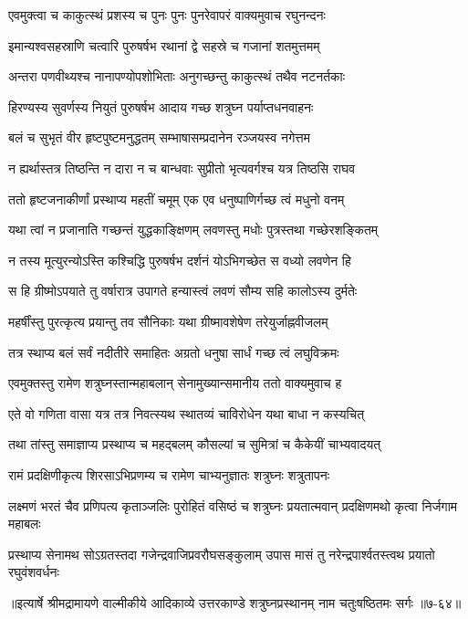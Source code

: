 
\twolineshloka
{एवमुक्त्वा च काकुत्स्थं प्रशस्य च पुनः पुनः}
{पुनरेवापरं वाक्यमुवाच रघुनन्दनः} %

\twolineshloka
{इमान्यश्वसहस्राणि चत्वारि पुरुषर्षभ}
{रथानां द्वे सहस्रे च गजानां शतमुत्तमम्} %

\twolineshloka
{अन्तरा पणवीथ्यश्च नानापण्योपशोभिताः}
{अनुगच्छन्तु काकुत्स्थं तथैव नटनर्तकाः} %

\twolineshloka
{हिरण्यस्य सुवर्णस्य नियुतं पुरुषर्षभ}
{आदाय गच्छ शत्रुघ्न पर्याप्तधनवाहनः} %

\twolineshloka
{बलं च सुभृतं वीर हृष्टपुष्टमनुद्धतम्}
{सम्भाषासम्प्रदानेन रञ्जयस्व नगेत्तम} %

\twolineshloka
{न ह्यर्थास्तत्र तिष्ठन्ति न दारा न च बान्धवाः}
{सुप्रीतो भृत्यवर्गश्च यत्र तिष्ठसि राघव} %

\twolineshloka
{ततो हृष्टजनाकीर्णां प्रस्थाप्य महतीं चमूम्}
{एक एव धनुष्पाणिर्गच्छ त्वं मधुनो वनम्} %

\twolineshloka
{यथा त्वां न प्रजानाति गच्छन्तं युद्धकाङ्क्षिणम्}
{लवणस्तु मधोः पुत्रस्तथा गच्छेरशङ्कितम्} %

\twolineshloka
{न तस्य मूत्युरन्योऽस्ति कश्चिद्धि पुरुषर्षभ}
{दर्शनं योऽभिगच्छेत स वध्यो लवणेन हि} %

\twolineshloka
{स हि ग्रीष्मोऽपयाते तु वर्षारात्र उपागते}
{हन्यास्त्वं लवणं सौम्य सहि कालोऽस्य दुर्मतेः} %

\twolineshloka
{महर्षींस्तु पुरत्कृत्य प्रयान्तु तव सौनिकाः}
{यथा ग्रीष्मावशेषेण तरेयुर्जाह्नवीजलम्} %

\twolineshloka
{तत्र स्थाप्य बलं सर्वं नदीतीरे समाहितः}
{अग्रतो धनुषा सार्धं गच्छ त्वं लघुविक्रमः} %

\twolineshloka
{एवमुक्तस्तु रामेण शत्रुघ्नस्तान्महाबलान्}
{सेनामुख्यान्समानीय ततो वाक्यमुवाच ह} %

\twolineshloka
{एते वो गणिता वासा यत्र तत्र निवत्स्यथ}
{स्थातव्यं चाविरोधेन यथा बाधा न कस्यचित्} %

\twolineshloka
{तथा तांस्तु समाज्ञाप्य प्रस्थाप्य च महद्बलम्}
{कौसल्यां च सुमित्रां च कैकेयीं चाभ्यवादयत्} %

\twolineshloka
{रामं प्रदक्षिणीकृत्य शिरसाऽभिप्रणम्य च}
{रामेण चाभ्यनुज्ञातः शत्रुघ्नः शत्रुतापनः} %

\threelineshloka
{लक्ष्मणं भरतं चैव प्रणिपत्य कृताञ्जलिः}
{पुरोहितं वसिष्ठं च शत्रुघ्नः प्रयतात्मवान्}
{प्रदक्षिणमथो कृत्वा निर्जगाम महाबलः} %

\twolineshloka
{प्रस्थाप्य सेनामथ सोऽग्रतस्तदा गजेन्द्रवाजिप्रवरौघसङ्कुलाम्}
{उपास मासं तु नरेन्द्रपार्श्वतस्त्वथ प्रयातो रघुवंशवर्धनः} %


॥इत्यार्षे श्रीमद्रामायणे वाल्मीकीये आदिकाव्ये उत्तरकाण्डे शत्रुघ्नप्रस्थानम् नाम चतुःषष्ठितमः सर्गः ॥७-६४॥
